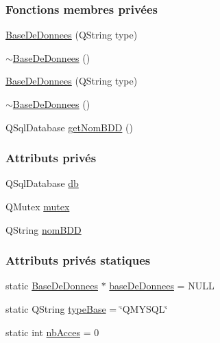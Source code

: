 \subsubsection*{Fonctions membres privées}
\begin{DoxyCompactItemize}
\item 
\hyperlink{class_base_de_donnees_a10dd177f1008f675ab78c2221b2a6750}{Base\+De\+Donnees} (Q\+String type)
\item 
\hyperlink{class_base_de_donnees_a5dc474cdbe003644fb0ca7b8f2ec6b93}{$\sim$\+Base\+De\+Donnees} ()
\item 
\hyperlink{class_base_de_donnees_a10dd177f1008f675ab78c2221b2a6750}{Base\+De\+Donnees} (Q\+String type)
\item 
\hyperlink{class_base_de_donnees_a5dc474cdbe003644fb0ca7b8f2ec6b93}{$\sim$\+Base\+De\+Donnees} ()
\item 
Q\+Sql\+Database \hyperlink{class_base_de_donnees_a467909531ae3cdebaf173f6e97cdc624}{get\+Nom\+B\+DD} ()
\end{DoxyCompactItemize}
\subsubsection*{Attributs privés}
\begin{DoxyCompactItemize}
\item 
Q\+Sql\+Database \hyperlink{class_base_de_donnees_a3e738dcf443370c46a541677ab619f06}{db}
\item 
Q\+Mutex \hyperlink{class_base_de_donnees_aa1b4696fac87a740f914aa73739086f2}{mutex}
\item 
Q\+String \hyperlink{class_base_de_donnees_a67c1d973c267a8f5fd6d7461550faa11}{nom\+B\+DD}
\end{DoxyCompactItemize}
\subsubsection*{Attributs privés statiques}
\begin{DoxyCompactItemize}
\item 
static \hyperlink{class_base_de_donnees}{Base\+De\+Donnees} $\ast$ \hyperlink{class_base_de_donnees_a218c44b630523435e2f6f8f2f0c484f8}{base\+De\+Donnees} = N\+U\+LL
\item 
static Q\+String \hyperlink{class_base_de_donnees_ab682b82167f494496a6531bfe522b42b}{type\+Base} = \char`\"{}Q\+M\+Y\+S\+QL\char`\"{}
\item 
static int \hyperlink{class_base_de_donnees_a5d2e5264c826c6600fd20a9831fd1782}{nb\+Acces} = 0
\end{DoxyCompactItemize}


